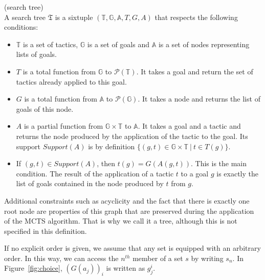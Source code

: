 \documentclass[runningheads,a4paper,draft]{svjour3}
\begin{document}
\begin{definition}(search tree)\\
A search tree $\mathfrak{T}$ is a sixtuple
$(\mathbb{T},\mathbb{G},\mathbb{A},T,G,A)$
that respects the following conditions:
\begin{itemize}
\item $\mathbb{T}$ is a set of tactics, $\mathbb{G}$ is a set of goals
 and $\mathbb{A}$ is a set of nodes representing lists of goals.
\item $T$ is a total function from $\mathbb{G}$ to $\mathcal{P}(\mathbb{T})$. It takes a
goal and return the set of tactics already applied to this goal.
\item $G$ is a total function from $\mathbb{A}$ to $\mathcal{P}(\mathbb{G})$. It takes a
node and returns the list of goals of this node.
\item $A$ is a partial function from $\mathbb{G} \times \mathbb{T}$ to
$\mathbb{A}$. It takes a goal and a tactic and returns the node produced by the
application of the tactic to the goal. Its support $\mathit{Support}(A)$ is by
definition $\lbrace (g,t) \in
\mathbb{G} \times \mathbb{T}\ |\ t \in T(g)
\rbrace$.
\item If $(g,t) \in \mathit{Support}(A)$, then $t(g) = G(A(g,t))$. This is the
main condition. The result of the application of a tactic $t$
to a goal $g$ is exactly the list of goals contained in the node produced by
$t$ from $g$.
\end{itemize}


Additional constraints such as acyclicity and the fact that there is exactly
one root node are properties of this graph that are preserved during the
application of the MCTS algorithm. That is why we call it a tree, although this
is not specified in this definition.
\end{definition}

If no explicit order is given, we assume that any set is equipped with an
arbitrary order. In this way, we can access the $n^{th}$ member of a set $s$ by
writing $s_n$. In Figure~\ref{fig:choice}, $(G(a_j))_i$ is written as $g_j^i$.
\end{document}
